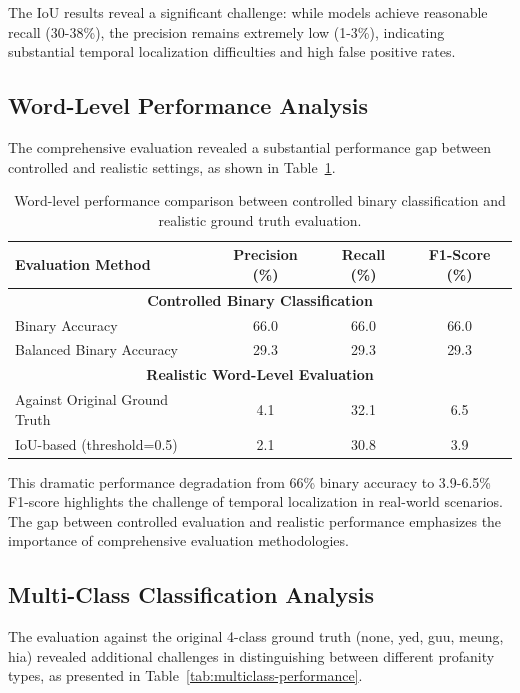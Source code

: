 \documentclass[11pt]{article}
\begin{document}
The IoU results reveal a significant challenge: while models achieve reasonable recall (30-38\%), the precision remains extremely low (1-3\%), indicating substantial temporal localization difficulties and high false positive rates.

\subsection{Word-Level Performance Analysis}
The comprehensive evaluation revealed a substantial performance gap between controlled and realistic settings, as shown in Table~\ref{tab:word-level-performance}.

\begin{table}[H]
    \caption{Word-level performance comparison between controlled binary classification and realistic ground truth evaluation.}
    \centering
    \label{tab:word-level-performance}
    \begin{tabular}{|l|c|c|c|}
        \hline
        \textbf{Evaluation Method} & \textbf{Precision (\%)} & \textbf{Recall (\%)} & \textbf{F1-Score (\%)} \\
        \hline
        \multicolumn{4}{|c|}{\textbf{Controlled Binary Classification}} \\
        \hline
        Binary Accuracy & 66.0 & 66.0 & 66.0 \\
        Balanced Binary Accuracy & 29.3 & 29.3 & 29.3 \\
        \hline
        \multicolumn{4}{|c|}{\textbf{Realistic Word-Level Evaluation}} \\
        \hline
        Against Original Ground Truth & 4.1 & 32.1 & 6.5 \\
        IoU-based (threshold=0.5) & 2.1 & 30.8 & 3.9 \\
        \hline
    \end{tabular}
\end{table}

This dramatic performance degradation from 66\% binary accuracy to 3.9-6.5\% F1-score highlights the challenge of temporal localization in real-world scenarios. The gap between controlled evaluation and realistic performance emphasizes the importance of comprehensive evaluation methodologies.

\subsection{Multi-Class Classification Analysis}
The evaluation against the original 4-class ground truth (none, yed, guu, meung, hia) revealed additional challenges in distinguishing between different profanity types, as presented in Table~\ref{tab:multiclass-performance}.
\end{document}
